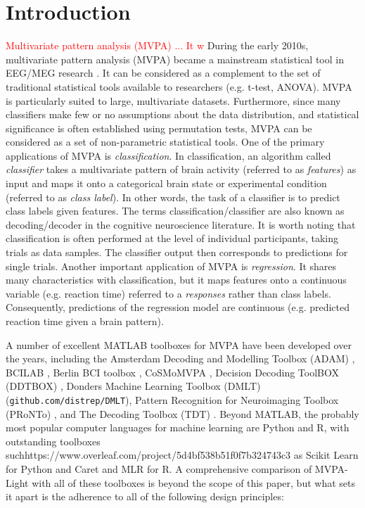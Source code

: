 \documentclass[utf8]{frontiersSCNS} %
\newcommand{\red}[1]{\textcolor{red}{#1}}
\begin{document}
\section{Introduction}

\red{Multivariate pattern analysis (MVPA) ... It w}
During the early 2010s, multivariate pattern analysis (MVPA) became a mainstream statistical tool in EEG/MEG research \citep{Blankertz2011,Lemm2011,Mur2009,Grootswagers2017DecodingData,Pereira2009,Varoquaux2017}. It can be considered as a complement to the set of traditional statistical tools available to researchers (e.g. t-test, ANOVA). MVPA is particularly suited to large, multivariate datasets. Furthermore, since many classifiers make few or no assumptions about the data distribution, and statistical significance is often established using permutation tests, MVPA can be considered as a set of non-parametric statistical tools.
One of the primary applications of MVPA is \textit{classification}. In classification, an algorithm called \textit{classifier} takes a multivariate pattern of brain activity (referred to as \textit{features}) as input and maps it onto a categorical brain state or experimental condition (referred to as \textit{class label}). In other words, the task of a classifier is to predict class labels given features. The terms classification/classifier are also known as decoding/decoder in the cognitive neuroscience literature. It is worth noting that classification is often performed at the level of individual participants, taking trials as data samples. The classifier output then corresponds to predictions for single trials. Another important application of MVPA is \textit{regression}. It shares many characteristics with classification, but it maps features onto a continuous variable (e.g. reaction time) referred to a \textit{responses} rather than class labels. Consequently, predictions of the regression model are continuous  (e.g. predicted reaction time given a brain pattern).

A number of excellent MATLAB toolboxes for MVPA have been developed over the years, including the Amsterdam Decoding and Modelling Toolbox (ADAM) \citep{Fahrenfort2018FromADAM}, BCILAB \citep{Kothe2013BCILAB:Development}, Berlin BCI toolbox \citep{Blankertz2016TheControl}, CoSMoMVPA \citep{Oosterhof2016CoSMoMVPA:Octave}, Decision Decoding ToolBOX (DDTBOX) \citep{Bode2019ThePotentials}, Donders Machine Learning Toolbox (DMLT) (\texttt{github.com/distrep/DMLT}), Pattern Recognition for Neuroimaging Toolbox (PRoNTo) \citep{Schrouff2013PRoNTo:Toolbox}, and The Decoding Toolbox (TDT) \citep{Hebart2015TheData}. Beyond MATLAB, the probably most popular computer languages for machine learning are Python and R, with outstanding toolboxes suchhttps://www.overleaf.com/project/5d4bf538b51f0f7b324743c3 as Scikit Learn \citep{Pedregosa2011Scikit-learn:Python} for Python and Caret \citep{Kuhn2008BuildingPackage} and MLR \citep{Bischl2000Mlr:R} for R. A comprehensive comparison of MVPA-Light with all of these toolboxes is beyond the scope of this paper, but what sets it apart is the adherence to all of the following design principles:
\end{document}
